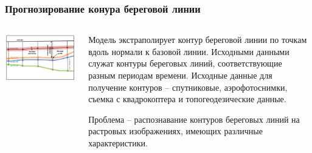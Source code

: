 \documentclass[handout]{beamer}
\begin{document}
\begin{frame}[fragile]
\begin{columns}
\begin{column}{0.5\linewidth}
    \end{column}
  \end{columns}
\end{frame}

\begin{frame}[fragile]
  \frametitle{Прогнозирование конура береговой линии}
  \begin{columns}
    \begin{column}{0.6\linewidth}
      \includegraphics[width=\linewidth]{dsas-model.png}
    \end{column}
    \begin{column}{0.4\linewidth}
      Модель экстраполирует контур береговой линии по точкам вдоль нормали к базовой линии.  Исходными данными служат контуры береговых линий, соответствующие разным периодам времени.  Исходные данные для получение контуров -- спутниковые, аэрофотоснимки, съемка с квадрокоптера и топогеодезические данные.

      Проблема -- распознавание контуров береговых линий на растровых изображениях, имеющих различные характеристики.
    \end{column}
  \end{columns}
\end{frame}
\end{document}
